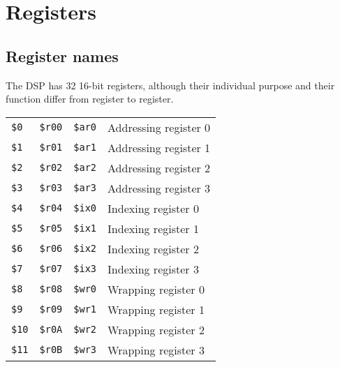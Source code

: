 \documentclass[oneside,english,a4paper,10pt,oneside,openany,final]{memoir}
\newcommand{\Register}[1]{\texttt{#1}}
\begin{document}
\pagebreak{}

\chapter{Registers}

\section{Register names}

The DSP has 32 16-bit registers, although their individual purpose and their function differ from register to register.

\begin{table}[htb]
\centering
\begin{tabular}{|l|l|l|l|}
\hline
                &                  &                      &                             \\ \hline
\Register{\$0}  & \Register{\$r00} & \Register{\$ar0}     & Addressing register 0       \\ \hline
\Register{\$1}  & \Register{\$r01} & \Register{\$ar1}     & Addressing register 1       \\ \hline
\Register{\$2}  & \Register{\$r02} & \Register{\$ar2}     & Addressing register 2       \\ \hline
\Register{\$3}  & \Register{\$r03} & \Register{\$ar3}     & Addressing register 3       \\ \hline
\Register{\$4}  & \Register{\$r04} & \Register{\$ix0}     & Indexing register 0         \\ \hline
\Register{\$5}  & \Register{\$r05} & \Register{\$ix1}     & Indexing register 1         \\ \hline
\Register{\$6}  & \Register{\$r06} & \Register{\$ix2}     & Indexing register 2         \\ \hline
\Register{\$7}  & \Register{\$r07} & \Register{\$ix3}     & Indexing register 3         \\ \hline
\Register{\$8}  & \Register{\$r08} & \Register{\$wr0}     & Wrapping register 0         \\ \hline
\Register{\$9}  & \Register{\$r09} & \Register{\$wr1}     & Wrapping register 1         \\ \hline
\Register{\$10} & \Register{\$r0A} & \Register{\$wr2}     & Wrapping register 2         \\ \hline
\Register{\$11} & \Register{\$r0B} & \Register{\$wr3}     & Wrapping register 3         \\ \hline

\end{tabular}
\end{table}
\end{document}
